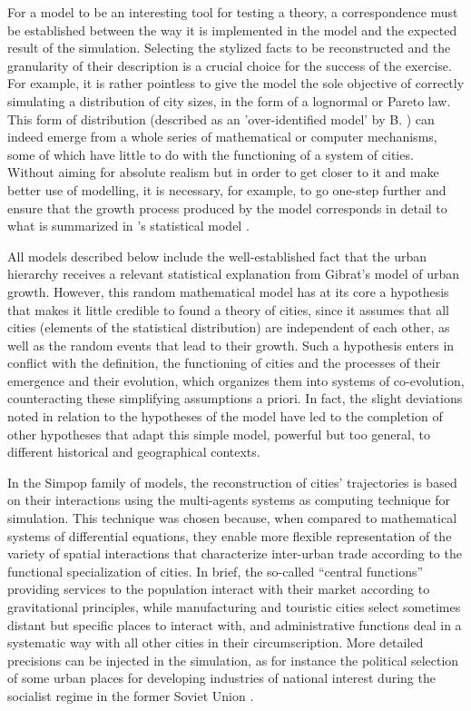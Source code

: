 \documentclass[10pt,letterpaper]{article}
\begin{document}
For a model to be an interesting tool for testing a theory, a correspondence must be established between the way it is implemented in the model and the expected result of the simulation. Selecting the stylized facts to be reconstructed and the granularity of their description is a crucial choice for the success of the exercise. For example, it is rather pointless to give the model the sole objective of correctly simulating a distribution of city sizes, in the form of a lognormal or Pareto law. This form of distribution (described as an 'over-identified model' by B. \cite{robson1973urban}) can indeed emerge from a whole series of mathematical or computer mechanisms, some of which have little to do with the functioning of a system of cities. Without aiming for absolute realism but in order to get closer to it and make better use of modelling, it is necessary, for example, to go one-step further and ensure that the growth process produced by the model corresponds in detail to what is summarized in \cite{gibrat1931inegalites}'s statistical model \citep{modica2017methodological}.


All models described below include the well-established fact that the urban hierarchy receives a relevant statistical explanation from Gibrat's model of urban growth. However, this random mathematical model has at its core a hypothesis that makes it little credible to found a theory of cities, since it assumes that all cities (elements of the statistical distribution) are independent of each other, as well as the random events that lead to their growth. Such a hypothesis enters in conflict with the definition, the functioning of cities and the processes of their emergence and their evolution, which organizes them into systems of co-evolution, counteracting these simplifying assumptions a priori. In fact, the slight deviations noted in relation to the hypotheses of the model have led to the completion of other hypotheses that adapt this simple model, powerful but too general, to different historical and geographical contexts.

In the Simpop family of models, the reconstruction of cities' trajectories is based on their interactions using the multi-agents systems as computing technique for simulation. This technique was chosen because, when compared to mathematical systems of differential equations, they enable more flexible representation of the variety of spatial interactions that characterize inter-urban trade according to the functional specialization of cities. In brief, the so-called ``central functions'' providing services to the population interact with their market according to gravitational principles, while manufacturing and touristic cities select sometimes distant but specific places to interact with, and administrative functions deal in a systematic way with all other cities in their circumscription. More detailed precisions can be injected in the simulation, as for instance the political selection of some urban places for developing industries of national interest during the socialist regime in the former Soviet Union \citep{cottineau2014evolution}.
\end{document}
